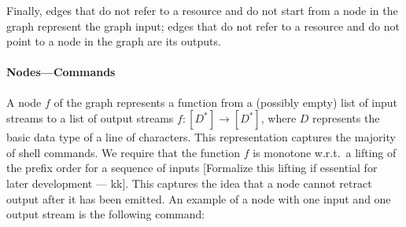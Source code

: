 \documentclass[letterpaper,twocolumn,10pt]{article}
\newcommand{\eg}{{\em e.g.}, }
\newcommand{\ttt}[1]{\texttt{\small #1}}
\newcommand{\kk}[1]{[{\color{magenta}#1 --- kk}]}
\newcommand{\tr}[1]{} %
\newcommand{\kstar}{^{\textstyle *}}
\begin{document}



\tr{On the other hand, some forms of data parallelism can be exposed
  when knowing the size of the input files. As mentioned in \ref{}
  some pure commands (such as cat -n) only need line information to
  become stateless, and knowing the size of a file could allow the
  system to split it in different chunks that can be processed
  independently. To account for that, edges that refer to an input
  resource contain the number of lines of the file that they refer
  to.}

Finally, edges that do not refer to a resource and do not start
from a node in the graph represent the graph input;
edges that do not refer to a resource and do not point to a node in the graph are its outputs.


\paragraph{Nodes---Commands}

A node $f$ of the graph represents a function from a (possibly empty)
list of input streams to a list of output streams $f : [D\kstar] \to
[D\kstar]$, where $D$ represents the basic data type of a line of
characters. This representation captures the majority of shell
commands. We require that the function $f$ is monotone w.r.t.\ a
lifting of the prefix order for a sequence of inputs \kk{Formalize
this lifting if essential for later development}. This captures the
  idea that a node cannot retract output after it has been emitted.
An example of a node with one input and one output stream is the
following command:
\end{document}
